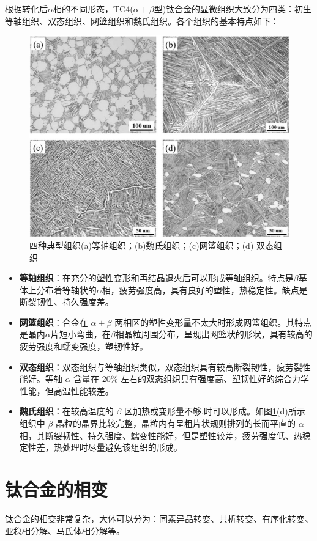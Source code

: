根据转化后$\alpha$相的不同形态，TC4($\alpha+\beta$型)钛合金的显微组织大致分为四类：初生等轴组织、双态组织、网篮组织和魏氏组织。各个组织的基本特点如下：
\begin{figure}[h!]
	\centering
	\includegraphics[width=0.7\linewidth]{pic/四种典型组织}
	\caption{四种典型组织(a)等轴组织；(b)魏氏组织；(c)网篮组织；(d) 双态组织}
	\label{fig:classic}
\end{figure}

\begin{itemize}
	\item 	\textbf{等轴组织}：在充分的塑性变形和再结晶退火后可以形成等轴组织。特点是$ \beta $基体上分布着等轴状的$ \alpha $相，疲劳强度高，具有良好的塑性，热稳定性。缺点是断裂韧性、持久强度差。
	\item 	\textbf{网篮组织}：合金在 $\alpha+\beta$ 两相区的塑性变形量不太大时形成网篮组织。其特点是晶内$ \alpha $片短小弯曲，在$ \beta $相晶粒周围分布，呈现出网篮状的形状，具有较高的疲劳强度和蠕变强度，塑韧性好。
	\item 	\textbf{双态组织}：双态组织与等轴组织类似，双态组织具有较高断裂韧性，疲劳裂性能好。等轴 $\alpha$ 含量在 $20 \%$ 左右的双态组织具有强度高、塑韧性好的综合力学性能，但高温性能较差。
	\item 	\textbf{魏氏组织}：在较高温度的 $\beta$ 区加热或变形量不够,时可以形成。如图\ref{fig:classic}(d)所示组织中 $\beta$ 晶粒的晶界比较完整，晶粒内有呈粗片状规则排列的长而平直的 $ \alpha $相，其断裂韧性、持久强度、蠕变性能好，但是塑性较差，疲劳强度低、热稳定性差，热处理时尽量避免该组织的形成。
\end{itemize}

\section{钛合金的相变}
钛合金的相变非常复杂，大体可以分为：同素异晶转变、共析转变、有序化转变、亚稳相分解、马氏体相分解等。


